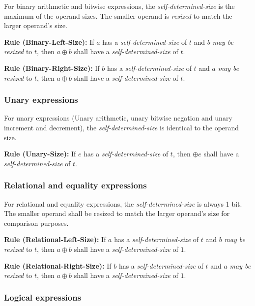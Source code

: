\documentclass{article}
\newcommand{\sds}{\emph{self-determined-size}}
\newcommand{\mbr}{\emph{may be resized}}
\newenvironment{typingrule}[1]%
{\par\noindent\textbf{Rule (#1):} }%
{\par}
\begin{document}
For binary arithmetic and bitwise expressions, the \sds{}
is the maximum of the operand sizes. The smaller operand is \emph{resized}
to match the larger operand's size.

\begin{typingrule}{Binary-Left-Size}
  If $a$ has a \sds{} of $t$ and $b$ \mbr{}
  to $t$, then $a \oplus b$ shall have a \sds{} of $t$.
\end{typingrule}

\begin{typingrule}{Binary-Right-Size}
  If $b$ has a \sds{} of $t$ and $a$ \mbr{}
  to $t$, then $a \oplus b$ shall have a \sds{} of $t$.
\end{typingrule}

\subsubsection{Unary expressions}%
\label{unary-expressions}

For unary expressions (Unary arithmetic, unary bitwise negation and unary
increment and decrement), the \sds{} is identical to the
operand size.

\begin{typingrule}{Unary-Size}
  If $e$ has a \sds{} of $t$, then $\oplus e$ shall have
  a \sds{} of $t$.
\end{typingrule}

\subsubsection{Relational and equality expressions}%
\label{relational-and-equality-expressions}

For relational and equality expressions, the \sds{} is
always 1 bit. The smaller operand shall be resized to match the larger operand's
size for comparison purposes.

\begin{typingrule}{Relational-Left-Size}
  If $a$ has a \sds{} of $t$ and $b$ \mbr{}
  to $t$, then $a \oplus b$ shall have a \sds{} of $1$.
\end{typingrule}

\begin{typingrule}{Relational-Right-Size}
  If $b$ has a \sds{} of $t$ and $a$ \mbr{}
  to $t$, then $a \oplus b$ shall have a \sds{} of $1$.
\end{typingrule}

\subsubsection{Logical expressions}%
\label{logical-expressions}
\end{document}

